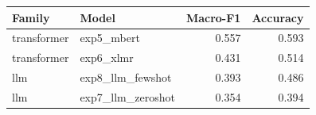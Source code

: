 \begin{tabular}{llrr}
\toprule
Family & Model & Macro-F1 & Accuracy \\
\midrule
transformer & exp5_mbert & 0.557 & 0.593 \\
transformer & exp6_xlmr & 0.431 & 0.514 \\
llm & exp8_llm_fewshot & 0.393 & 0.486 \\
llm & exp7_llm_zeroshot & 0.354 & 0.394 \\
\bottomrule
\end{tabular}